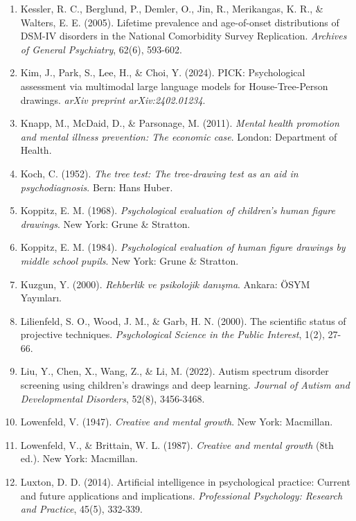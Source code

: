 \begin{enumerate}
\item Kessler, R. C., Berglund, P., Demler, O., Jin, R., Merikangas, K. R., \& Walters, E. E. (2005). Lifetime prevalence and age-of-onset distributions of DSM-IV disorders in the National Comorbidity Survey Replication. \textit{Archives of General Psychiatry}, 62(6), 593-602.

\item Kim, J., Park, S., Lee, H., \& Choi, Y. (2024). PICK: Psychological assessment via multimodal large language models for House-Tree-Person drawings. \textit{arXiv preprint arXiv:2402.01234}.

\item Knapp, M., McDaid, D., \& Parsonage, M. (2011). \textit{Mental health promotion and mental illness prevention: The economic case}. London: Department of Health.

\item Koch, C. (1952). \textit{The tree test: The tree-drawing test as an aid in psychodiagnosis}. Bern: Hans Huber.

\item Koppitz, E. M. (1968). \textit{Psychological evaluation of children's human figure drawings}. New York: Grune \& Stratton.

\item Koppitz, E. M. (1984). \textit{Psychological evaluation of human figure drawings by middle school pupils}. New York: Grune \& Stratton.

\item Kuzgun, Y. (2000). \textit{Rehberlik ve psikolojik danışma}. Ankara: ÖSYM Yayınları.

\item Lilienfeld, S. O., Wood, J. M., \& Garb, H. N. (2000). The scientific status of projective techniques. \textit{Psychological Science in the Public Interest}, 1(2), 27-66.

\item Liu, Y., Chen, X., Wang, Z., \& Li, M. (2022). Autism spectrum disorder screening using children's drawings and deep learning. \textit{Journal of Autism and Developmental Disorders}, 52(8), 3456-3468.

\item Lowenfeld, V. (1947). \textit{Creative and mental growth}. New York: Macmillan.

\item Lowenfeld, V., \& Brittain, W. L. (1987). \textit{Creative and mental growth} (8th ed.). New York: Macmillan.

\item Luxton, D. D. (2014). Artificial intelligence in psychological practice: Current and future applications and implications. \textit{Professional Psychology: Research and Practice}, 45(5), 332-339.


\end{enumerate}
